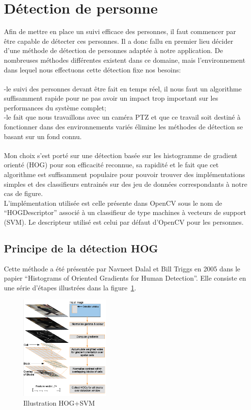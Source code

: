 \documentclass[12pt]{article}
\begin{document}
\section{Détection de personne}
Afin de mettre en place un suivi efficace des personnes, il faut commencer par être capable de détecter ces personnes. Il a donc fallu en premier lieu décider d'une méthode de détection de personnes adaptée à notre application. De nombreuses méthodes différentes existent dans ce domaine, mais l'environnement dans lequel nous effectuons cette détection fixe nos besoins:\\
\\
-le suivi des personnes devant être fait en temps réel, il nous faut un algorithme suffisamment rapide pour ne pas avoir un impact trop important sur les performances du système complet;\\
-le fait que nous travaillons avec un caméra PTZ et que ce travail soit destiné à fonctionner dans des environnements variés élimine les méthodes de détection se basant sur un fond connu.\\
\\
Mon choix s'est porté sur une détection basée sur les histogramme de gradient orienté (HOG) pour son efficacité reconnue, sa rapidité et le fait que cet algorithme est suffisamment populaire pour pouvoir trouver des implémentations simples et des classifieurs entrainés sur des jeu de données correspondants à notre cas de figure.\\
L’implémentation utilisée est celle présente dans OpenCV sous le nom de ``HOGDescriptor'' associé à un classifieur de type machines à vecteurs de support (SVM). Le descripteur utilisé est celui par défaut d'OpenCV pour les personnes.
\subsection{Principe de la détection HOG}
Cette méthode a été présentée par Navneet Dalal et Bill Triggs en 2005 dans le papier ``Histograms of Oriented Gradients for Human Detection''.
Elle consiste en une série d'étapes illustrées dans la figure~\ref{fig:hog_topo}.
\begin{figure}[!ht]
    \centering
	    \includegraphics[width=0.4\textwidth]{img/hog_topo.png}
	    \caption{Illustration HOG+SVM}
   	    \label{fig:hog_topo}
\end{figure}
\end{document}
